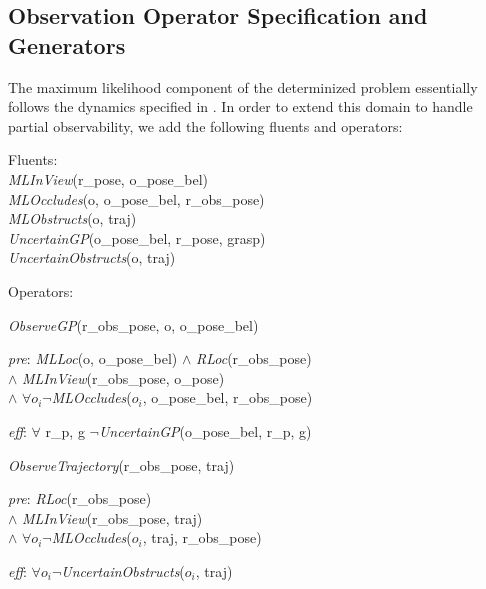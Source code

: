 \subsection{Observation Operator Specification and Generators}
The maximum likelihood component of the determinized problem
essentially follows the dynamics specified in
. In order to extend this domain to handle
partial observability, we add the following fluents and operators:
\begin{tightlist}
  \item[]Fluents: \\\emph{MLInView}(r\_pose, o\_pose\_bel)\\
    \emph{MLOccludes}(o, o\_pose\_bel, r\_obs\_pose)\\
    \emph{MLObstructs}(o, traj)\\
    \emph{UncertainGP}(o\_pose\_bel, r\_pose, grasp)\\
    \emph{UncertainObstructs}(o, traj)
  \item[]Operators:
  \begin{tightlist} \item \emph{ObserveGP}(r\_obs\_pose, o, o\_pose\_bel)
\begin{tightlist}
  \item[\emph{pre}:] \emph{MLLoc}(o, o\_pose\_bel) $\wedge$
    \emph{RLoc}(r\_obs\_pose) \\ $\wedge$
    \emph{MLInView}(r\_obs\_pose, o\_pose) \\ $\wedge$ $\forall o_i
    \lnot$\emph{MLOccludes}($o_i$, o\_pose\_bel, r\_obs\_pose)
  \item[\emph{eff}:] $\forall$ r\_p, g $\lnot$\emph{UncertainGP}(o\_pose\_bel, r\_p, g)
\end{tightlist}
\item  \emph{ObserveTrajectory}(r\_obs\_pose, traj) 

\begin{tightlist}
  \item[\emph{pre}:] \emph{RLoc}(r\_obs\_pose) \\$\wedge$
    \emph{MLInView}(r\_obs\_pose, traj)\\ $\wedge$
    $\forall o_i \lnot$\emph{MLOccludes}($o_i$, traj, r\_obs\_pose)
  \item[\emph{eff}:] $\forall o_i \lnot$\emph{UncertainObstructs}($o_i$,
    traj)
\end{tightlist}
\end{tightlist}
\end{tightlist}

